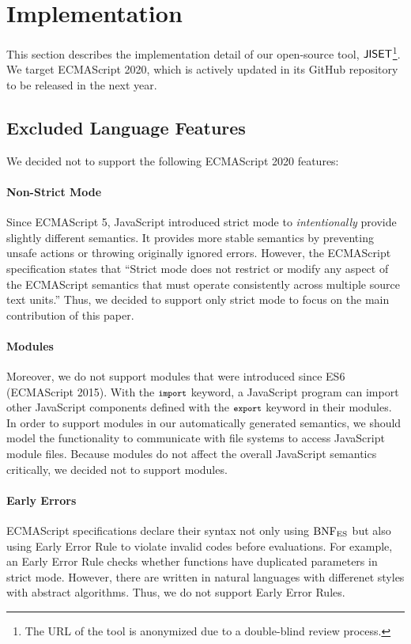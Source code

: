 \section{Implementation}\label{sec:impl}
This section describes the implementation detail of our open-source
tool, \( \text{\sf JISET} \)\footnote{The URL of the tool is anonymized due to a
double-blind review process.}.  We target
ECMAScript 2020, which is actively updated in its
GitHub repository~\cite{es2020} to be released in the next year.

\subsection{Excluded Language Features}\label{sec:exclusion}
We decided not to support the following ECMAScript 2020 features:

\paragraph{Non-Strict Mode}
Since ECMAScript 5, JavaScript introduced strict mode to
\textit{intentionally} provide slightly different semantics.  It
provides more stable semantics by preventing unsafe actions or
throwing originally ignored errors.  However, the ECMAScript
specification states that ``Strict mode does not restrict or modify
any aspect of the ECMAScript semantics that must operate consistently
across multiple source text units.''  Thus, we decided to support only
strict mode to focus on the main contribution of this paper.

\paragraph{Modules}
Moreover, we do not support modules that were introduced since ES6
(ECMAScript 2015).  With the \( \texttt{\footnotesize import} \) keyword, a JavaScript
program can import other JavaScript components defined with the \(
\texttt{\footnotesize export} \) keyword in their modules.  In order to support
modules in our automatically generated semantics, we should model the
functionality to communicate with file systems to access JavaScript
module files.  Because modules do not affect the overall JavaScript
semantics critically, we decided not to support modules.

\paragraph{Early Errors}
ECMAScript specifications declare their syntax not only using
\( \text{BNF}_{\text{ES}} \) but also using Early Error Rule to violate invalid codes
before evaluations. For example, an Early Error Rule checks whether
functions have duplicated parameters in strict mode. However,
there are written in natural languages with differenet styles
with abstract algorithms. Thus, we do not support Early Error Rules.

